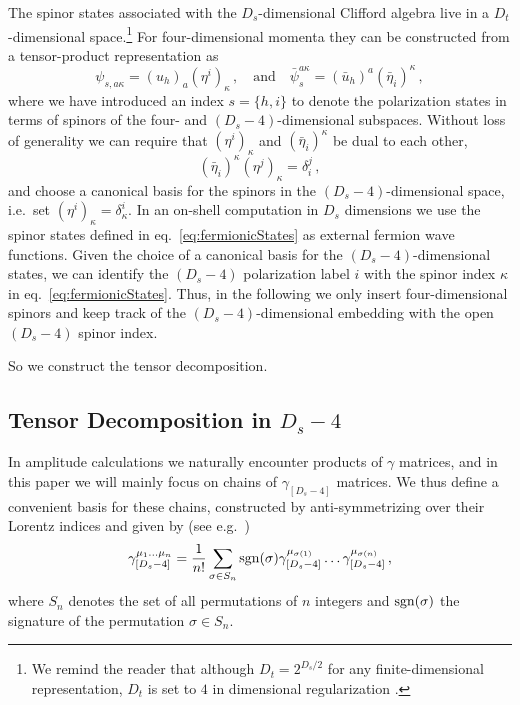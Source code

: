 The spinor states associated with the $D_s$-dimensional 
Clifford algebra live in a $D_t$-dimensional space.\footnote{We 
remind the reader that although $D_t=2^{D_s/2}$ for any 
finite-dimensional representation, $D_t$ is set to $4$ in 
dimensional regularization \cite{Collins:1984xc}.}
For four-dimensional momenta they can be constructed from a 
tensor-product representation as
\begin{equation} 
\label{eq:fermionicStates}
\psi_{s,a \kappa} =  (u_h)_a (\eta^i)_\kappa \,,
\quad\mbox{and}\quad
\bar \psi_s^{a \kappa} = 
(\bar u_h)^{a}  (\bar \eta_i)^\kappa\,,
\end{equation}
%
where we have introduced an index $s=\{h, i \}$ to denote the
polarization states in terms of spinors of the four- and 
$(D_s-4)$-dimensional subspaces. 
Without loss of generality we can
require that $(\eta^i)_\kappa$ and $(\bar \eta_i)^\kappa$ 
be dual to each other,
%
\begin{equation}
\label{eqn:qspinors}
(\bar \eta_i)^\kappa (\eta^j)_\kappa = \delta_i^j\,,
\end{equation}
and choose a canonical basis for the 
spinors in the $(D_s-4)$-dimensional space,
i.e.\ set $(\eta^i)_\kappa=\delta^i_\kappa$.
%
In an on-shell computation in $D_s$ dimensions we use the 
spinor states defined in eq.~\eqref{eq:fermionicStates}
as external fermion wave functions.
Given the choice of a canonical basis for the 
$(D_s-4)$-dimensional states, we can identify the
$(D_s-4)$ polarization label $i$ with the spinor index 
$\kappa$ in eq.~\eqref{eq:fermionicStates}.
Thus, in the following we only insert four-dimensional spinors
and keep track of the $(D_s-4)$-dimensional embedding with 
the open $(D_s-4)$ spinor index.

So we construct the tensor decomposition.




\subsection{Tensor Decomposition in $D_s-4$}
\label{sec:HelAmplHV}

In amplitude calculations we naturally encounter products of
$\gamma$ matrices, and in this paper we will mainly focus
on chains of $\gamma_{[D_s-4]}$ matrices. 
We thus define a convenient basis for these chains, 
constructed by anti-symmetrizing over their Lorentz
indices and given by (see e.g.\ \cite{Kreuzer:susylectures})
\begin{align}\label{eq:basisGammaChainDs}
\gamma_{[D_s-4]}^{\mu_1 \ldots \mu_n} = \frac{1}{n!} \sum_{ \sigma\in S_n} \operatorname{sgn}(\sigma) \gamma_{[D_s-4]}^{\mu_{\sigma(1)}} \ldots \gamma_{[D_s-4]}^{\mu_{\sigma(n)}}\,,
\end{align}
where $S_n$ denotes the set of all permutations of $n$
integers and $\operatorname{sgn}(\sigma)$ the signature of the permutation
$\sigma\in S_n$.





